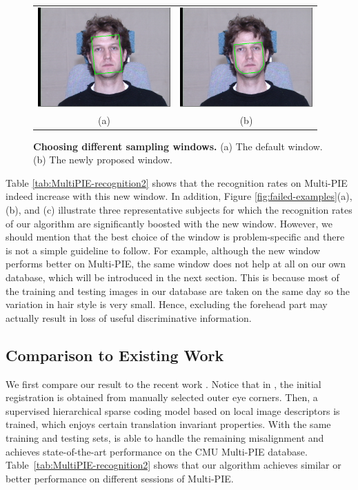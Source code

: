 \documentclass[10pt,journal,letterpaper,compsoc]{IEEEtran} %
\begin{document}
\begin{figure}
\centering
{\small
\begin{tabular}{cc}
\includegraphics[height=1.5in]{figures_pami/example.png} &
\includegraphics[height=1.5in]{figures_pami/example_new.png} \vspace{0mm} \\
(a) & (b) \vspace{0mm}
\end{tabular}
}
\caption{{\bf Choosing different sampling windows.} (a) The default window. (b) The newly proposed window.}
\label{fig:new-mask}
\vspace{0mm}
\end{figure}

Table \ref{tab:MultiPIE-recognition2} shows that the
recognition rates on Multi-PIE indeed increase with this new
window. In addition, Figure \ref{fig:failed-examples}(a), (b),
and (c) illustrate three representative subjects for which the
recognition rates of our algorithm are significantly boosted
with the new window. However, we should mention that the best
choice of the window is problem-specific and there is not a
simple guideline to follow. For example, although the new
window performs better on Multi-PIE, the same window does not
help at all on our own database, which will be introduced in
the next section. This is because most of the training and
testing images in our database are taken on the same day so the
variation in hair style is very small. Hence, excluding the
forehead part may actually result in loss of useful
discriminative information.

\subsection{Comparison to Existing Work}
We first compare our result to the recent work
\cite{Yang2010-CVPR}. Notice that in \cite{Yang2010-CVPR}, the
initial registration is obtained from manually selected outer
eye corners. Then, a supervised hierarchical sparse coding
model based on local image descriptors is trained, which enjoys
certain translation invariant properties. With the same
training and testing sets, \cite{Yang2010-CVPR} is able to
handle the remaining misalignment and achieves state-of-the-art
performance on the CMU Multi-PIE database.
Table~\ref{tab:MultiPIE-recognition2} shows that our algorithm
achieves similar or better performance on different sessions of
Multi-PIE.
\end{document}
